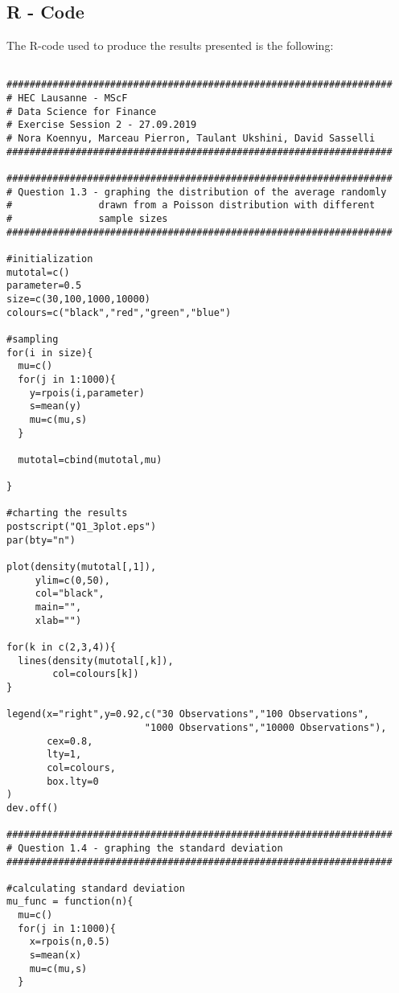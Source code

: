 \begin{appendices}

\chapter{R - Code}

The R-code used to produce the results presented is the following:

\begin{verbatim}

###################################################################
# HEC Lausanne - MScF
# Data Science for Finance
# Exercise Session 2 - 27.09.2019
# Nora Koennyu, Marceau Pierron, Taulant Ukshini, David Sasselli
###################################################################

###################################################################
# Question 1.3 - graphing the distribution of the average randomly
#               drawn from a Poisson distribution with different
#               sample sizes
###################################################################

#initialization
mutotal=c()
parameter=0.5
size=c(30,100,1000,10000)
colours=c("black","red","green","blue")

#sampling
for(i in size){
  mu=c()
  for(j in 1:1000){
    y=rpois(i,parameter)
    s=mean(y)
    mu=c(mu,s)
  }
  
  mutotal=cbind(mutotal,mu)
  
}

#charting the results
postscript("Q1_3plot.eps")
par(bty="n")

plot(density(mutotal[,1]),
     ylim=c(0,50),
     col="black",
     main="",
     xlab="")

for(k in c(2,3,4)){
  lines(density(mutotal[,k]),
        col=colours[k])
}

legend(x="right",y=0.92,c("30 Observations","100 Observations",
                        "1000 Observations","10000 Observations"),
       cex=0.8,
       lty=1,
       col=colours,
       box.lty=0
)
dev.off()

###################################################################
# Question 1.4 - graphing the standard deviation
###################################################################

#calculating standard deviation
mu_func = function(n){
  mu=c()
  for(j in 1:1000){
    x=rpois(n,0.5)
    s=mean(x)
    mu=c(mu,s)
  }
  

\end{verbatim}
\end{appendices}

